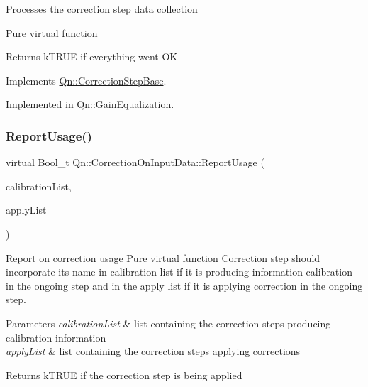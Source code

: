 Processes the correction step data collection

Pure virtual function \begin{DoxyReturn}{Returns}
k\+T\+R\+UE if everything went OK 
\end{DoxyReturn}


Implements \mbox{\hyperlink{classQn_1_1CorrectionStepBase_a77005ff85ae351cb290fee4adb41c029}{Qn\+::\+Correction\+Step\+Base}}.



Implemented in \mbox{\hyperlink{classQn_1_1GainEqualization_a9984ec9a1056bc3e336ff9ac50888641}{Qn\+::\+Gain\+Equalization}}.

\mbox{\label{classQn_1_1CorrectionOnInputData_a40b05b6db47e8dd52e1f6a616b9b9d3a}} 
\subsubsection{\texorpdfstring{Report\+Usage()}{ReportUsage()}}
{\footnotesize\ttfamily virtual Bool\+\_\+t Qn\+::\+Correction\+On\+Input\+Data\+::\+Report\+Usage (\begin{DoxyParamCaption}\item[{T\+List $\ast$}]{calibration\+List,  }\item[{T\+List $\ast$}]{apply\+List }\end{DoxyParamCaption})\hspace{0.3cm}{\ttfamily [pure virtual]}}

Report on correction usage Pure virtual function Correction step should incorporate its name in calibration list if it is producing information calibration in the ongoing step and in the apply list if it is applying correction in the ongoing step. 
\begin{DoxyParams}{Parameters}
{\em calibration\+List} & list containing the correction steps producing calibration information \\
\hline
{\em apply\+List} & list containing the correction steps applying corrections \\
\hline
\end{DoxyParams}
\begin{DoxyReturn}{Returns}
k\+T\+R\+UE if the correction step is being applied 
\end{DoxyReturn}


